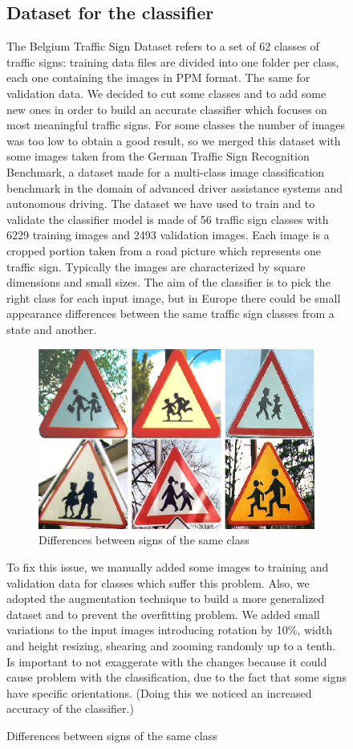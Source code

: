 \begin{figure}[h]{}

\subsection{Dataset for the classifier}
The Belgium Traffic Sign Dataset refers to a set of 62 classes of traffic signs: training data files are divided into one folder per class, each one containing the images in PPM format. The same for validation data. We decided to cut some classes and to add some new ones in order to build an accurate classifier which focuses on most meaningful traffic signs. For some classes the number of images was too low to obtain a good result, so we merged this dataset with some images taken from the German Traffic Sign Recognition Benchmark, a dataset made for a multi-class image classification benchmark in the domain of advanced driver assistance systems and autonomous driving. The dataset we have used to train and to validate the classifier model is made of 56 traffic sign classes with 6229 training images and 2493 validation images. Each image is a cropped portion taken from a road picture which represents one traffic sign. Typically the images are characterized by square dimensions and small sizes. 
The aim of the classifier is to pick the right class for each input image, but in Europe there could be small appearance differences between the same traffic sign classes from a state and another.
\begin{figure}{}
	\centering
	\includegraphics[width=0.6\linewidth]{Res/Immagini/differences.png}
	\caption{Differences between signs of the same class}\label{}
\end{figure}
To fix this issue, we manually added some images to training and validation data for classes which suffer this problem. Also, we adopted the augmentation technique to build a more generalized dataset and to prevent the overfitting problem. We added small variations to the input images introducing rotation by 10\%, width and height resizing, shearing and zooming randomly up to a tenth. Is important to not exaggerate with the changes because it could cause problem with the classification, due to the fact that some signs have specific orientations. (Doing this we noticed an increased accuracy of the classifier.)


\end{figure}
